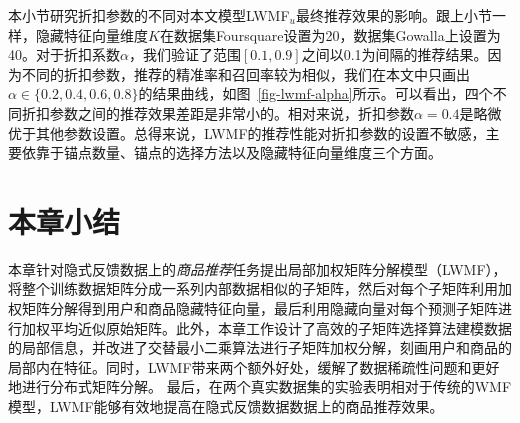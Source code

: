 本小节研究折扣参数的不同对本文模型{LWMF$_u$}最终推荐效果的影响。跟上小节一样，隐藏特征向量维度$K$在数据集Foursquare设置为20，数据集Gowalla上设置为40。对于折扣系数$\alpha$，我们验证了范围$[0.1,0.9]$之间以0.1为间隔的推荐结果。因为不同的折扣参数，推荐的精准率和召回率较为相似，我们在本文中只画出$\alpha \in \{0.2,0.4,0.6,0.8\}$的结果曲线，如图~\ref{fig-lwmf-alpha}所示。可以看出，四个不同折扣参数之间的推荐效果差距是非常小的。相对来说，折扣参数$\alpha = 0.4$是略微优于其他参数设置。总得来说，LWMF的推荐性能对折扣参数的设置不敏感，主要依靠于锚点数量、锚点的选择方法以及隐藏特征向量维度三个方面。

\section{本章小结}
本章针对隐式反馈数据上的\textit{商品推荐}任务提出局部加权矩阵分解模型（LWMF），将整个训练数据矩阵分成一系列内部数据相似的子矩阵，然后对每个子矩阵利用加权矩阵分解得到用户和商品隐藏特征向量，最后利用隐藏向量对每个预测子矩阵进行加权平均近似原始矩阵。此外，本章工作设计了高效的子矩阵选择算法建模数据的局部信息，并改进了交替最小二乘算法进行子矩阵加权分解，刻画用户和商品的局部内在特征。同时，LWMF带来两个额外好处，缓解了数据稀疏性问题和更好地进行分布式矩阵分解。 最后，在两个真实数据集的实验表明相对于传统的WMF模型，LWMF能够有效地提高在隐式反馈数据数据上的商品推荐效果。

\clearpage
\phantom{s}
\clearpage